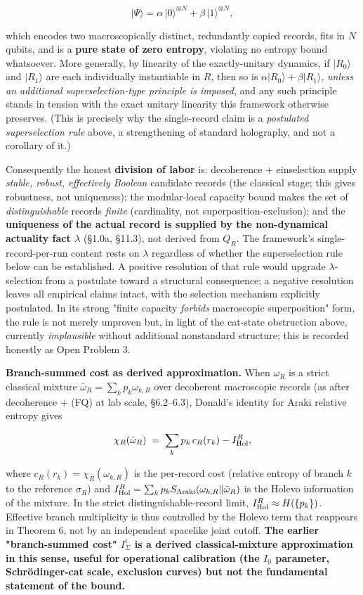 \documentclass[11pt,a4paper]{article}
\begin{document}
\[
|\Psi\rangle = \alpha\,|0\rangle^{\otimes N} + \beta\,|1\rangle^{\otimes N},
\]

which encodes two macroscopically distinct, redundantly copied records, fits in $N$ qubits, and is a \textbf{pure state of zero entropy}, violating no entropy bound whatsoever. More generally, by linearity of the exactly-unitary dynamics, if $|R_0\rangle$ and $|R_1\rangle$ are each individually instantiable in $R$, then so is $\alpha|R_0\rangle + \beta|R_1\rangle$, \emph{unless an additional superselection-type principle is imposed}, and any such principle stands in tension with the exact unitary linearity this framework otherwise preserves. (This is precisely why the single-record claim is a \emph{postulated superselection rule} above, a strengthening of standard holography, and not a corollary of it.)

Consequently the honest \textbf{division of labor} is: decoherence + einselection supply \emph{stable, robust, effectively Boolean} candidate records (the classical stage; this gives robustness, not uniqueness); the modular-local capacity bound makes the set of \emph{distinguishable} records \emph{finite} (cardinality, not superposition-exclusion); and the \textbf{uniqueness of the actual record is supplied by the non-dynamical actuality fact $\lambda$} (§1.0a, §11.3), not derived from $Q_R$. The framework's single-record-per-run content rests on $\lambda$ regardless of whether the superselection rule below can be established. A positive resolution of that rule would upgrade $\lambda$-selection from a postulate toward a structural consequence; a negative resolution leaves all empirical claims intact, with the selection mechanism explicitly postulated. In its strong "finite capacity \emph{forbids} macroscopic superposition" form, the rule is not merely unproven but, in light of the cat-state obstruction above, currently \emph{implausible} without additional nonstandard structure; this is recorded honestly as Open Problem 3.

\textbf{Branch-summed cost as derived approximation.} When $\omega_R$ is a strict classical mixture $\bar\omega_R = \sum_k p_k \omega_{k,R}$ over decoherent macroscopic records (as after decoherence + (FQ) at lab scale, §6.2–6.3), Donald's identity for Araki relative entropy gives

\[
\chi_R(\bar\omega_R) \;=\; \sum_k p_k \, c_R(r_k) - I_{\rm Hol}^R,
\]

where $c_R(r_k) = \chi_R(\omega_{k,R})$ is the per-record cost (relative entropy of branch $k$ to the reference $\sigma_R$) and $I_{\rm Hol}^R = \sum_k p_k S_{\rm Araki}(\omega_{k,R} \| \bar\omega_R)$ is the Holevo information of the mixture. In the strict distinguishable-record limit, $I_{\rm Hol}^R \approx H(\{p_k\})$. Effective branch multiplicity is thus controlled by the Holevo term that reappears in Theorem 6, not by an independent spacelike joint cutoff. \textbf{The earlier "branch-summed cost" $I_\Sigma^\epsilon$ is a derived classical-mixture approximation in this sense, useful for operational calibration (the $I_0$ parameter, Schrödinger-cat scale, exclusion curves) but not the fundamental statement of the bound.}
\end{document}

